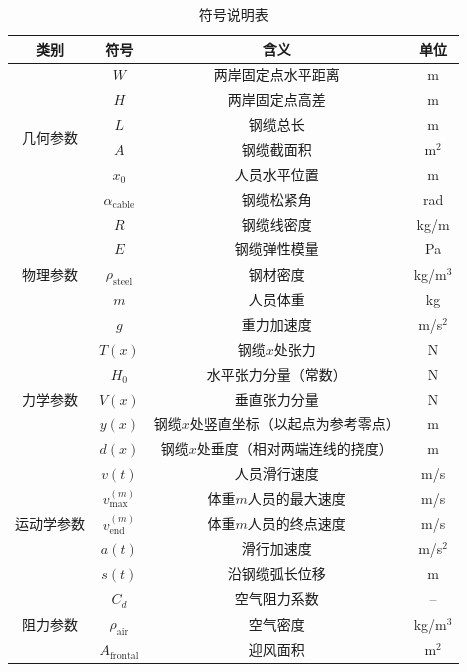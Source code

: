 \documentclass[12pt,a4paper]{ctexart}
\begin{document}
\begin{table}[H]
  \centering
  \caption{符号说明表}
  \label{tab:symbols}
  \renewcommand{\arraystretch}{1.1}
  \begin{tabular}{c|c|c|c}
    \toprule
    \textbf{类别} & \textbf{符号} & \textbf{含义} & \textbf{单位} \\
    \midrule
    \multirow{6}{*}{几何参数}
      & $W$   & 两岸固定点水平距离 & m \\
      & $H$   & 两岸固定点高差 & m \\
      & $L$   & 钢缆总长 & m \\
      & $A$   & 钢缆截面积 & m$^2$ \\
      & $x_0$ & 人员水平位置 & m \\
      & $\alpha_{\text{cable}}$ & 钢缆松紧角 & rad \\
    \midrule
    \multirow{5}{*}{物理参数}
      & $R$   & 钢缆线密度 & kg/m \\
      & $E$   & 钢缆弹性模量 & Pa \\
      & $\rho_{\text{steel}}$ & 钢材密度 & kg/m$^3$ \\
      & $m$   & 人员体重 & kg \\
      & $g$   & 重力加速度 & m/s$^2$ \\
    \midrule
    \multirow{5}{*}{力学参数}
      & $T(x)$   & 钢缆$x$处张力 & N \\
      & $H_0$    & 水平张力分量（常数） & N \\
      & $V(x)$   & 垂直张力分量 & N \\
      & $y(x)$   & 钢缆$x$处竖直坐标（以起点为参考零点） & m \\
      & $d(x)$   & 钢缆$x$处垂度（相对两端连线的挠度） & m \\
    \midrule
    \multirow{5}{*}{运动学参数}
      & $v(t)$         & 人员滑行速度 & m/s \\
      & $v^{(m)}_{\max}$ & 体重$m$人员的最大速度 & m/s \\
      & $v^{(m)}_{\text{end}}$ & 体重$m$人员的终点速度 & m/s \\
      & $a(t)$         & 滑行加速度 & m/s$^2$ \\
      & $s(t)$         & 沿钢缆弧长位移 & m \\
    \midrule
    \multirow{6}{*}{阻力参数}
      & $C_d$       & 空气阻力系数 & -- \\
      & $\rho_{\text{air}}$ & 空气密度 & kg/m$^3$ \\
      & $A_{\text{frontal}}$ & 迎风面积 & m$^2$ \\

\end{tabular}
\end{table}
\end{document}
